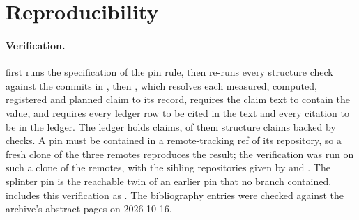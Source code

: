 
\section{Reproducibility}\label{sec:repro}

\paragraph{Verification.}  first runs the
specification of the pin rule, then re-runs every structure check against the commits in
, then , which resolves each measured,
computed, registered and planned claim to its record, requires the claim text to contain the value,
and requires every ledger row to be cited in the text and every citation to be in the ledger.
The ledger holds \mLedgerClaims{} claims, \mLedgerStructure{} of them structure claims backed by
\mLedgerChecks{} checks. A pin must be contained in a remote-tracking ref of its repository, so a
fresh clone of the three remotes reproduces the result; the verification was run on such a clone
of the remotes, with the sibling repositories given by  and . The
splinter pin is the reachable twin of an earlier pin that no branch contained.
 includes this verification as . The bibliography entries
were checked against the archive's abstract pages on 2026-10-16.

